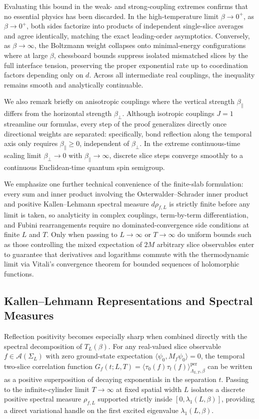 \documentclass[11pt]{article}
\theoremstyle{definition}
\begin{document}
Evaluating this bound in the weak- and strong-coupling extremes confirms that no
essential physics has been discarded. In the high-temperature limit $\beta \to 0^+$,
as $\beta \to 0^+$, both sides factorize into products of independent single-slice
averages and agree identically, matching the exact leading-order asymptotics.
Conversely, as $\beta \to \infty$, the Boltzmann weight collapses onto
minimal-energy configurations where at large $\beta$, chessboard bounds suppress
isolated mismatched slices by the full interface tension, preserving the proper
exponential rate up to coordination factors depending only on $d$. Across all
intermediate real couplings, the inequality remains smooth and analytically
continuable.

We also remark briefly on anisotropic couplings where the vertical strength
$\beta_\parallel$ differs from the horizontal strength $\beta_\perp$. Although
isotropic couplings $J = 1$ streamline our formulas, every step of the proof
generalizes directly once directional weights are separated: specifically, bond
reflection along the temporal axis only requires $\beta_\parallel \ge 0$,
independent of $\beta_\perp$. In the extreme continuous-time scaling limit
$\beta_\perp \to 0$ with $\beta_\parallel \to \infty$, discrete slice steps converge
smoothly to a continuous Euclidean-time quantum spin semigroup.

We emphasize one further technical convenience of the finite-slab formulation: every
sum and inner product involving the Osterwalder--Schrader inner product and positive
Kallen--Lehmann spectral measure $d\rho_{f,L}$ is strictly finite before any limit
is taken, so analyticity in complex couplings, term-by-term differentiation, and
Fubini rearrangements require no dominated-convergence side conditions at finite $L$
and $T$. Only when passing to $L \to \infty$ or $T \to \infty$ do uniform bounds
such as those controlling the mixed expectation of $2M$ arbitrary slice observables
enter to guarantee that derivatives and logarithms commute with the thermodynamic
limit via Vitali's convergence theorem for bounded sequences of holomorphic
functions.

\subsection{Kallen--Lehmann Representations and Spectral Measures}
\label{subsec:s06b}

Reflection positivity becomes especially sharp when combined directly with the
spectral decomposition of $T_L(\beta)$. For any real-valued slice observable $f \in
\mathcal{A}(\Sigma_L)$ with zero ground-state expectation $\langle \psi_0, M_f
\psi_0 \rangle = 0$, the temporal two-slice correlation function $G_f(t; L, T) =
\langle \tau_0(f) \tau_t(f) \rangle_{\Lambda_{L,T},\beta}^{\mathrm{per}}$ can be
written as a positive superposition of decaying exponentials in the separation $t$.
Passing to the infinite-cylinder limit $T \to \infty$ at fixed spatial width $L$
isolates a discrete positive spectral measure $\rho_{f, L}$ supported strictly
inside $[0, \lambda_1(L, \beta)]$, providing a direct variational handle on the
first excited eigenvalue $\lambda_1(L, \beta)$.
\end{document}
